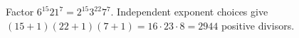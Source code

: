 Factor $6^{15}21^7=2^{15}3^{22}7^7$. Independent exponent choices give $(15+1)(22+1)(7+1)=16\cdot23\cdot8=\boxed{2944}$ positive divisors.
